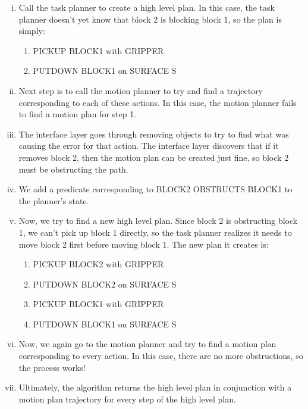 \documentclass[12pt]{article}
\begin{document}
\begin{enumerate}[i.]

\item Call the task planner to create a high level plan.  
In this case, the task planner doesn't yet know that block 2 is blocking block 1, so the plan is simply:

\begin{enumerate}[1.]
\item PICKUP BLOCK1 with GRIPPER

\item PUTDOWN BLOCK1 on SURFACE S
\end{enumerate}

\item Next step is to call the motion planner to try and find a trajectory corresponding to each of these actions.  
In this case, the motion planner fails to find a motion plan for step 1.  

\item The interface layer goes through removing objects to try to find what was causing the error for that action.  
The interface layer discovers that if it removes block 2, then the motion plan can be created just fine, so block 2 must be obstructing the path.

\item We add a predicate corresponding to BLOCK2 OBSTRUCTS BLOCK1 to the planner's state.

\item Now, we try to find a new high level plan.  
Since block 2 is obstructing block 1, we can't pick up block 1 directly, so the task planner realizes it needs to move block 2 first before moving block 1. 
The new plan it creates is:

\begin{enumerate}[1.]
\item PICKUP BLOCK2 	with GRIPPER
\item PUTDOWN BLOCK2 on SURFACE S
\item PICKUP BLOCK1 with GRIPPER
\item PUTDOWN BLOCK1 on SURFACE S
\end{enumerate}

\item Now, we again go to the motion planner and try to find a motion plan corresponding to every action.
In this case, there are no more obstructions, so the process works!

\item Ultimately, the algorithm returns the high level plan in conjunction with a motion plan trajectory for every step of the high level plan.

\end{enumerate}
\end{document}
